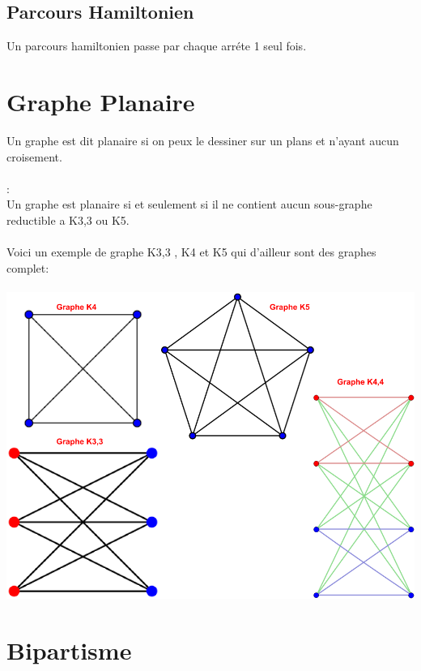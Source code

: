 \documentclass[a4paper,12pt,openany]{book}
\begin{document}

\section{Parcours Hamiltonien}

Un parcours hamiltonien passe par chaque arréte 1 seul fois.\\




\chapter{Graphe Planaire}

Un graphe est dit planaire si on peux le dessiner sur un plans et n'ayant aucun croisement.\\
\\
\underline{}: \\
Un graphe est planaire si et seulement si il ne contient aucun sous-graphe reductible a K3,3 ou K5.\\
\\
Voici un exemple de graphe K3,3 , K4 et K5 qui d'ailleur sont des graphes complet:\\
\\
\includegraphics[width=0.6\linewidth,center]{img/graph-K.png}




\chapter{Bipartisme}
\end{document}
